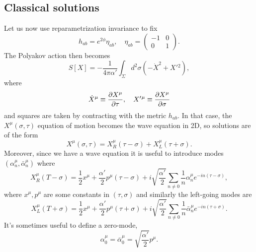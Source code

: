\subsection*{Classical solutions} Let us now use reparametrization invariance to fix
\begin{equation}
    h_{ab}=e^{2\phi} \eta_{ab}, \quad \eta_{ab}=\begin{pmatrix}
    -1 & 0\\
    0 & 1
    \end{pmatrix}.
\end{equation}
The Polyakov action then becomes
\begin{equation}
    S[X]=-\frac{1}{4\pi \alpha'} \int_\Sigma d^2 \sigma(-\dot X^2 + X'{}^2),
\end{equation}
where
\begin{equation}
    \dot X^\mu \equiv \P{X^\mu}{\tau},\quad X'{}^\mu \equiv \P{X^\mu}{\sigma}
\end{equation}
and squares are taken by contracting with the metric $h_{ab}$. In that case, the $X^\mu(\sigma,\tau)$ equation of motion becomes the wave equation in 2D, %
so solutions are of the form
\begin{equation}
    X^\mu(\sigma,\tau)= X^\mu_R (\tau-\sigma)+X^\mu_L(\tau + \sigma).
\end{equation}
Moreover, since we have a wave equation it is useful to introduce modes $(\alpha^\mu_n, \bar \alpha^\mu_n)$ where
\begin{equation}
    X^\mu_R(T-\sigma)=\frac{1}{2}x^\mu +\frac{\alpha'}{2}p^\mu(\tau-\sigma) +i\sqrt{\frac{\alpha'}{2}}\sum_{n\neq 0} \frac{1}{n}
    \alpha^\mu_n e^{-in(\tau-\sigma)},
\end{equation}
where $x^\mu, p^\mu$ are some constants in $(\tau,\sigma)$ and  similarly the left-going modes are
\begin{equation}
    X^\mu_L(T+\sigma)=\frac{1}{2}x^\mu +\frac{\alpha'}{2}p^\mu(\tau+\sigma) +i\sqrt{\frac{\alpha'}{2}}\sum_{n\neq 0} \frac{1}{n}
    \bar\alpha^\mu_n e^{-in(\tau+\sigma)}.
\end{equation}
It's sometimes useful to define a zero-mode,
\begin{equation}
    \alpha_0^\mu = \bar \alpha_0^\mu = \sqrt{\frac{\alpha'}{2}}p^\mu.
\end{equation}